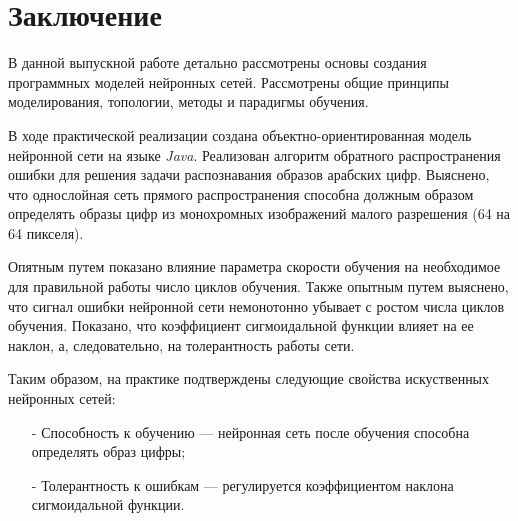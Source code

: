 \section*{\centering Заключение}

В данной выпускной работе  детально рассмотрены основы создания программных моделей нейронных сетей.
Рассмотрены общие принципы моделирования, топологии, методы и парадигмы обучения.

В ходе практической реализации  создана объектно-ориентированная модель нейронной сети на языке {\it Java}.
Реализован алгоритм обратного распространения ошибки для решения задачи распознавания образов арабских цифр.
Выяснено, что однослойная сеть прямого распространения способна должным образом определять образы цифр из монохромных изображений малого разрешения (64 на 64 пикселя).

Опятным путем  показано влияние параметра скорости обучения на необходимое для правильной работы число циклов обучения.
Также опытным путем выяснено, что сигнал ошибки нейронной сети немонотонно убывает с ростом числа циклов обучения.
Показано, что коэффициент сигмоидальной функции влияет на ее наклон, а, следовательно, на толерантность работы сети.

Таким образом, на практике подтверждены следующие свойства искуственных нейронных сетей:
\begin{itemize}
\item[-] Способность к обучению --- нейронная сеть после обучения способна определять образ цифры;
\item[-] Толерантность к ошибкам --- регулируется коэффициентом наклона сигмоидальной функции.
\end{itemize}


\newpage